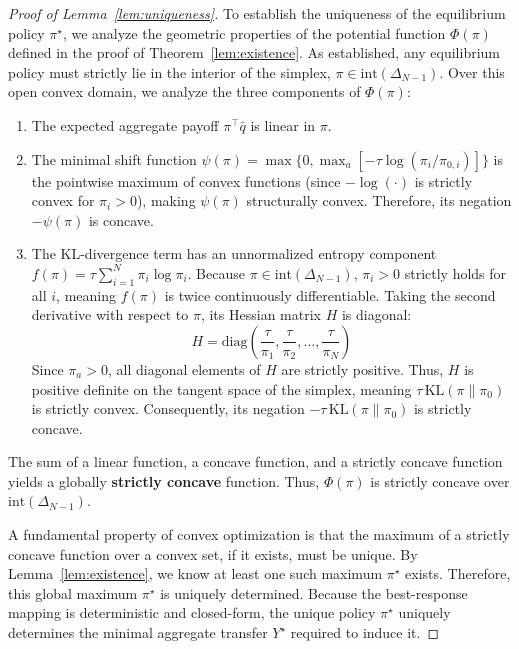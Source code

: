 \documentclass{article}
\begin{document}
\begin{proof}[Proof of Lemma~\ref{lem:uniqueness}]
To establish the uniqueness of the equilibrium policy $\pi^\star$, we analyze the geometric properties of the potential function $\Phi(\pi)$ defined in the proof of Theorem~\ref{lem:existence}. As established, any equilibrium policy must strictly lie in the interior of the simplex, $\pi \in \mathrm{int}(\Delta_{N-1})$. Over this open convex domain, we analyze the three components of $\Phi(\pi)$:
\begin{enumerate}
    \item The expected aggregate payoff $\pi^\top \bar{q}$ is linear in $\pi$.
    \item The minimal shift function $\psi(\pi) = \max\{0, \max_{a} [-\tau \log(\pi_i/\pi_{0,i})]\}$ is the pointwise maximum of convex functions (since $-\log(\cdot)$ is strictly convex for $\pi_i > 0$), making $\psi(\pi)$ structurally convex. Therefore, its negation $-\psi(\pi)$ is concave.
    \item The KL-divergence term has an unnormalized entropy component $f(\pi) = \tau \sum_{i=1}^N \pi_i \log \pi_i$. Because $\pi \in \mathrm{int}(\Delta_{N-1})$, $\pi_i > 0$ strictly holds for all $i$, meaning $f(\pi)$ is twice continuously differentiable. Taking the second derivative with respect to $\pi$, its Hessian matrix $H$ is diagonal:
    \begin{equation}
        H = \mathrm{diag}\left( \frac{\tau}{\pi_1}, \frac{\tau}{\pi_2}, \dots, \frac{\tau}{\pi_N} \right)
    \end{equation}
    Since $\pi_a > 0$, all diagonal elements of $H$ are strictly positive. Thus, $H$ is positive definite on the tangent space of the simplex, meaning $\tau\,\mathrm{KL}(\pi \parallel \pi_0)$ is strictly convex. Consequently, its negation $-\tau\,\mathrm{KL}(\pi \parallel \pi_0)$ is strictly concave.
\end{enumerate}

The sum of a linear function, a concave function, and a strictly concave function yields a globally \textbf{strictly concave} function. Thus, $\Phi(\pi)$ is strictly concave over $\mathrm{int}(\Delta_{N-1})$.

A fundamental property of convex optimization is that the maximum of a strictly concave function over a convex set, if it exists, must be unique. By Lemma~\ref{lem:existence}, we know at least one such maximum $\pi^\star$ exists. Therefore, this global maximum $\pi^\star$ is uniquely determined. Because the best-response mapping is deterministic and closed-form, the unique policy $\pi^\star$ uniquely determines the minimal aggregate transfer $Y^\star$ required to induce it.
\end{proof}
\end{document}

